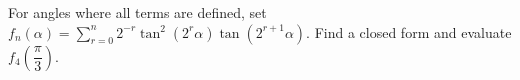 For angles where all terms are defined, set $f_n(\alpha)=\sum_{r=0}^n2^{-r}\tan^2(2^r\alpha)\tan(2^{r+1}\alpha)$. Find a closed form and evaluate $f_4 (\dfrac{\pi}{3})$.
